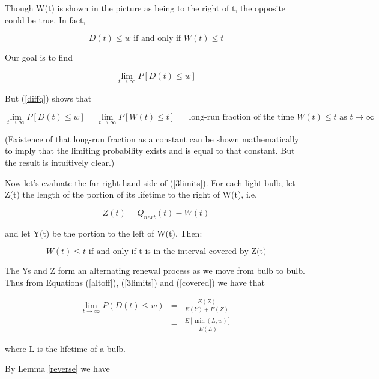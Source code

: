 Though W(t) is shown in the picture as being to the right of t, the
opposite could be true.  In fact,

\begin{equation}
\label{diffq}
D(t) \leq w \textrm{ if and only if } W(t) \leq t
\end{equation}

Our goal is to find

\begin{equation}
\lim_{t \rightarrow \infty} P[D(t) \leq w]
\end{equation}

But (\ref{diffq}) shows that

\begin{equation}
\label{3limits}
\lim_{t \rightarrow \infty} P[D(t) \leq w] = 
\lim_{t \rightarrow \infty} P[W(t) \leq t] =
\textrm{ long-run fraction of the time $W(t) \leq t$ as $t \rightarrow
\infty$} 
\end{equation}

(Existence of that long-run fraction as a constant can be shown
mathematically to imply that the limiting probability exists and is
equal to that constant.  But the result is intuitively clear.)

Now let's evaluate the far right-hand side of (\ref{3limits}).  For each
light bulb, let Z(t) the length of the portion of its lifetime to the
right of W(t), i.e.

\begin{equation}
Z(t) = Q_{next}(t) - W(t)
\end{equation}

and let Y(t) be the portion to the left of W(t).  Then:

\begin{equation}
\label{covered}
W(t) \leq t \textrm{ if and only if t is in the interval covered by Z(t)} 
\end{equation}

The Ys and Z form an alternating renewal process as we move from bulb to
bulb.  Thus from Equations (\ref{altoff}), (\ref{3limits}) and
(\ref{covered}) we have that 

\begin{eqnarray}
\lim_{t\rightarrow \infty }P(D(t)\leq w) & = & \frac{E(Z)}{E(Y)+E(Z)}\label{limrt} \\
 & = & \frac{E[\min(L,w)]}{E(L)}
\end{eqnarray}

where L is the lifetime of a bulb.

By Lemma \ref{reverse} we have 

